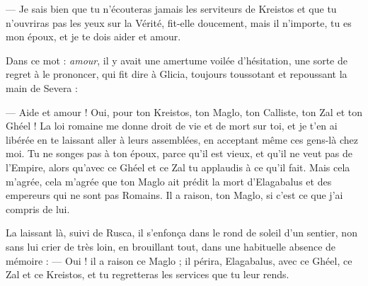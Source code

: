 \documentclass[a4paper, 11pt, oneside, polutonikogreek, french]{article}
\begin{document}
--- Je sais bien que tu n'écouteras jamais les serviteurs de Kreistos et que tu n'ouvriras pas les yeux sur la Vérité, fit-elle doucement, mais il n'importe, tu es mon époux, et je te dois aider et amour.

Dans ce mot : \emph{amour}, il y avait une amertume voilée d'hésitation, une sorte de regret à le prononcer, qui fit dire à Glicia, toujours toussotant et repoussant la main de Severa :

--- Aide et amour ! Oui, pour ton Kreistos, ton Maglo, ton Calliste, ton Zal et ton Ghéel ! La loi romaine me donne droit de vie et de mort sur toi, et je t'en ai libérée en te laissant aller à leurs assemblées, en acceptant même ces gens-là chez moi. Tu ne songes pas à ton époux, parce qu'il est vieux, et qu'il ne veut pas de l'Empire, alors qu'avec ce Ghéel et ce Zal tu applaudis à ce qu'il fait. Mais cela m'agrée, cela m'agrée que ton Maglo ait prédit la mort d'Elagabalus et des empereurs qui ne sont pas Romains. Il a raison, ton Maglo, si c'est ce que j'ai compris de lui.

La laissant là, suivi de Rusca, il s'enfonça dans le rond de soleil d'un sentier, non sans lui crier de très loin, en brouillant tout, dans une habituelle absence de mémoire : --- Oui ! il a raison ce Maglo ; il périra, Elagabalus, avec ce Ghéel, ce Zal et ce Kreistos, et tu regretteras les services que tu leur rends.
\end{document}
